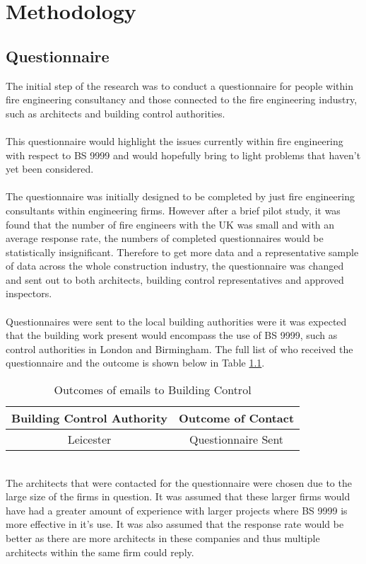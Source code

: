 \documentclass[a4paper,oneside]{report}
\begin{document}
\chapter{Methodology}
\section{Questionnaire}
The initial step of the research was to conduct a questionnaire for people within fire engineering consultancy and those connected to the fire engineering industry, such as architects and building control authorities.
\\
\\
This questionnaire would highlight the issues currently within fire engineering with respect to BS 9999 and would hopefully bring to light problems that haven't yet been considered.
\\
\\
The questionnaire was initially designed to be completed by just fire engineering consultants within engineering firms. However after a brief pilot study, it was found that the number of fire engineers with the UK was small and with an average response rate, the numbers of completed questionnaires would be statistically insignificant. Therefore to get  more data and a representative sample of data across the whole construction industry, the questionnaire was changed and sent out to both architects, building control representatives and approved inspectors.
\\
\\
Questionnaires were sent to the local building authorities were it was expected that the building work present would encompass the use of BS 9999, such as control authorities in London and Birmingham. The full list of who received the questionnaire and the outcome is shown below in Table \ref{tab:Build_Auth}.
\begin{table}
\begin{tabular}{|c|c|}
\hline
\textbf{Building Control Authority} & \textbf{Outcome of Contact} \\
\hline
Leicester & Questionnaire Sent \\
\hline
\end{tabular}
\caption{Outcomes of emails to Building Control}
\label{tab:Build_Auth}
\end{table}
\\
The architects that were contacted for the questionnaire were chosen due to the large size of the firms in question. It was assumed that these larger firms would have had a greater amount of experience with larger projects where BS 9999 is more effective in it's use. It was also assumed that the response rate would be better as there are more architects in these companies and thus multiple architects within the same firm could reply.
\end{document}
